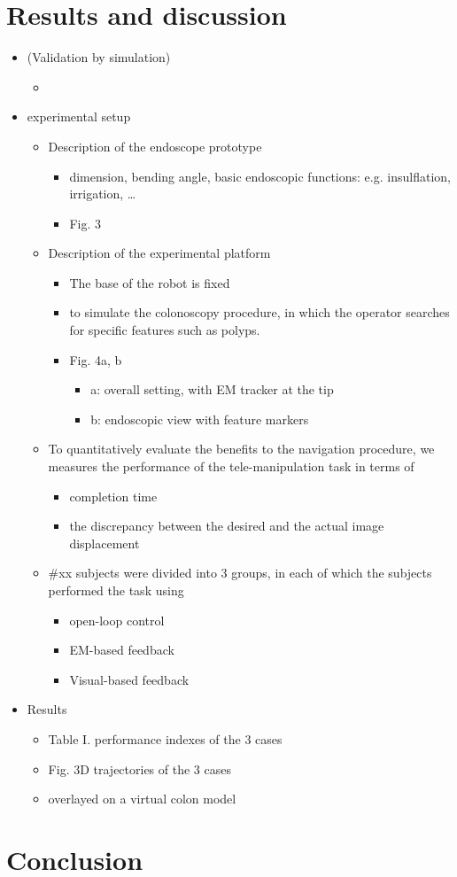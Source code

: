 \documentclass[journal,onecolumn]{IEEEtran}
\begin{document}
\section{Results and discussion}
\label{sec:orgcdea614}
\begin{itemize}
\item (Validation by simulation)
\begin{itemize}
\item 
\end{itemize}
\item experimental setup
\begin{itemize}
\item Description of the endoscope prototype
\begin{itemize}
\item dimension, bending angle, basic endoscopic functions: e.g. insulflation, irrigation, \ldots{}
\item Fig. 3
\end{itemize}
\item Description of the experimental platform
\begin{itemize}
\item The base of the robot is fixed
\item to simulate the colonoscopy procedure, in which the operator searches for specific features such as polyps.
\item Fig. 4a, b
\begin{itemize}
\item a: overall setting, with EM tracker at the tip
\item b: endoscopic view with feature markers
\end{itemize}
\end{itemize}
\item To quantitatively evaluate the benefits to the navigation procedure, we measures the performance of the tele-manipulation task in terms of
\begin{itemize}
\item completion time
\item the discrepancy between the desired and the actual image displacement
\end{itemize}
\item \#xx subjects were divided into 3 groups, in each of which the subjects performed the task using
\begin{itemize}
\item open-loop control
\item EM-based feedback
\item Visual-based feedback
\end{itemize}
\end{itemize}
\item Results
\begin{itemize}
\item Table I. performance indexes of the 3 cases
\item Fig. 3D trajectories of the 3 cases
\item overlayed on a virtual colon model
\end{itemize}
\end{itemize}

\section{Conclusion}
\label{sec:orga1dc18f}




\clearpage
\end{document}
